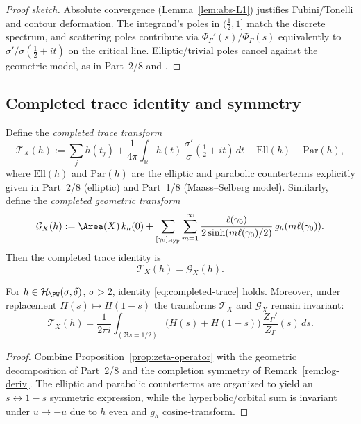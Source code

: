 \begin{proof}[Proof sketch]
Absolute convergence (Lemma~\ref{lem:abs-L1}) justifies Fubini/Tonelli
and contour deformation. The integrand's poles in $(\tfrac12,1]$ match
the discrete spectrum, and scattering poles contribute via
$\Phi_\Gamma'(s)/\Phi_\Gamma(s)$ equivalently to
$\sigma'/\sigma(\tfrac12+it)$ on the critical line. Elliptic/trivial
poles cancel against the geometric model, as in Part~2/8 and
\cite[Ch.~3]{HejhalII}.                                                  %
\end{proof}

\subsection{Completed trace identity and symmetry}
\label{subsec:completed-trace}
\relax\hspace{0pt}

Define the \emph{completed trace transform}
\[
\mathcal{T}_X(h)
:= \sum_{j}h(t_j)
+\frac{1}{4\pi}\int_{\mathbb{R}}h(t)\,
\frac{\sigma'}{\sigma}\!\left(\tfrac12+it\right)\,dt
-\mathrm{Ell}(h)-\mathrm{Par}(h),
\]
where $\mathrm{Ell}(h)$ and $\mathrm{Par}(h)$ are the elliptic and
parabolic counterterms explicitly given in Part~2/8 (elliptic) and
Part~1/8 (Maass–Selberg model). Similarly, define the \emph{completed
geometric transform}
\[
\mathcal{G}_X(h)
:= \Area(X)\,k_h(0)
+\sum_{[\gamma_0]_{\mathrm{Hyp}}}\sum_{m=1}^{\infty}
\frac{\ell(\gamma_0)}{2\sinh(m\ell(\gamma_0)/2)}\,g_h(m\ell(\gamma_0)).
\]
Then the completed trace identity is
\begin{equation}\label{eq:completed-trace}
\boxed{\quad
\mathcal{T}_X(h)=\mathcal{G}_X(h).
\quad}
\end{equation}

\begin{theorem}
\label{thm:completed-trace}
For $h\in\mathcal{H}_{\PW}(\sigma,\delta)$, $\sigma>2$, identity
\eqref{eq:completed-trace} holds. Moreover, under replacement
$H(s)\mapsto H(1-s)$ the transforms $\mathcal{T}_X$ and $\mathcal{G}_X$
remain invariant:
\[
\mathcal{T}_X(h)=\frac{1}{2\pi i}
\int_{(\Re s=1/2)}\big(H(s)+H(1-s)\big)\,
\frac{Z_\Gamma'}{Z_\Gamma}(s)\,ds.
\]
\end{theorem}

\begin{proof}
Combine Proposition~\ref{prop:zeta-operator} with the geometric
decomposition of Part~2/8 and the completion symmetry of
Remark~\ref{rem:log-deriv}. The elliptic and parabolic counterterms are
organized to yield an $s\leftrightarrow 1-s$ symmetric expression, while
the hyperbolic/orbital sum is invariant under $u\mapsto -u$ due to $h$
even and $g_h$ cosine-transform.                                        %
\end{proof}

